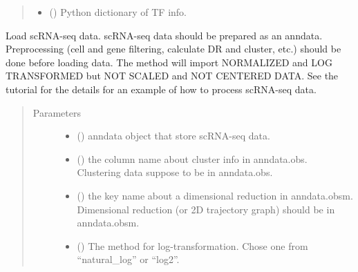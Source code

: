 \documentclass[letterpaper,10pt,english]{sphinxmanual}
\begin{document}
\begin{fulllineitems}
\begin{fulllineitems}
\begin{quote}
\begin{description}
\begin{itemize}
\item {} 
 () \textendash{} Python dictionary of TF info.

\end{itemize}

\end{description}\end{quote}

\end{fulllineitems}


\begin{fulllineitems}
\label{\detokenize{modules/celloracle:celloracle.Oracle.import_anndata_as_normalized_count}}
Load scRNA-seq data. scRNA-seq data should be prepared as an anndata.
Preprocessing (cell and gene filtering, calculate DR and cluster, etc.) should be done before loading data.
The method will import NORMALIZED and LOG TRANSFORMED but NOT SCALED and NOT CENTERED DATA.
See the tutorial for the details for an example of how to process scRNA-seq data.
\begin{quote}\begin{description}
\item[{Parameters}] \leavevmode\begin{itemize}
\item {} 
 () \textendash{} anndata object that store scRNA-seq data.

\item {} 
 () \textendash{} the column name about cluster info in anndata.obs.
Clustering data suppose to be in anndata.obs.

\item {} 
 () \textendash{} the key name about a dimensional reduction in anndata.obsm.
Dimensional reduction (or 2D trajectory graph) should be in anndata.obsm.

\item {} 
 () \textendash{} The method for log-transformation. Chose one from “natural\_log” or “log2”.


\end{itemize}
\end{description}
\end{quote}
\end{fulllineitems}
\end{fulllineitems}
\end{document}
